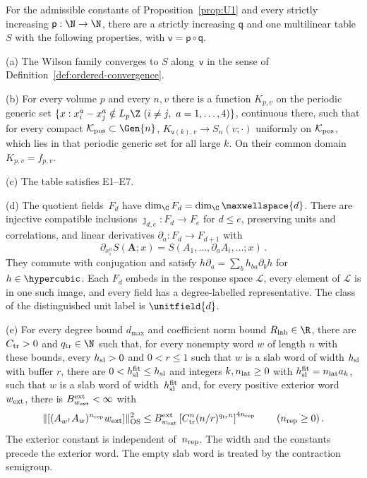 \begin{proposition}\label{prop:P5}
For the admissible constants of Proposition~\ref{prop:U1} and every strictly increasing $\mathsf p:\N\to\N$, there are a strictly increasing $\mathsf q$ and one multilinear table $S$ with the following properties, with $\mathsf v=\mathsf p\circ\mathsf q$.

(a) The Wilson family converges to $S$ along~$\mathsf v$ in the sense of Definition~\ref{def:ordered-convergence}.

(b) For every volume $p$ and every $n,v$ there is a function $K_{p,v}$ on the periodic generic set $\{x:x_i^a-x_j^a\notin L_p\Z\ (i\ne j,\ a=1,\ldots,4)\}$, continuous there, such that for every compact $\mathcal K_{\rm pos}\subset\Gen{n}$, $K_{\mathsf v(k),v}\to S_n(v;\cdot)$ uniformly on $\mathcal K_{\rm pos}$, which lies in that periodic generic set for all large $k$. On their common domain $K_{p,v}=f_{p,v}$.

(c) The table satisfies E1–E7.

(d) The quotient fields~$F_d$ have $\dim_{\C}F_d=\dim_{\C}\maxwellspace{d}$. There are injective compatible inclusions $\jmath_{d,e}:F_d\to F_e$ for $d\le e$, preserving units and correlations, and linear derivatives $\partial_a:F_d\to F_{d+1}$ with
\begin{equation}\label{eq:P5-1}
\partial_{x_i^a}S(\boldsymbol A;x)=S(A_1,\ldots,\partial_aA_i,\ldots;x)\,.
\end{equation}
They commute with conjugation and satisfy $h\partial_a=\sum_bh_{ba}\partial_bh$ for $h\in \hypercubic$. Each $F_d$ embeds in the response space $\mathcal L$, every element of $\mathcal L$ is in one such image, and every field has a degree-labelled representative. The class of the distinguished unit label is $\unitfield{d}$.

(e) For every degree bound $d_{\max}$ and coefficient norm bound $R_{\rm lab}\in\R$, there are $C_{\rm tr}>0$ and $q_{\rm tr}\in\N$ such that, for every nonempty word $w$ of length $n$ with these bounds, every $h_{\rm sl}>0$ and $0<r\le1$ such that $w$ is a slab word of width $h_{\rm sl}$ with buffer $r$, there are $0<h_{\rm sl}^{\rm fit}\le h_{\rm sl}$ and integers $k,n_{\rm lat}\ge0$ with $h_{\rm sl}^{\rm fit}=n_{\rm lat}a_k$, such that $w$ is a slab word of width~$h_{\rm sl}^{\rm fit}$ and, for every positive exterior word~$w_{\rm ext}$, there is $B_{w_{\rm ext}}^{\rm ext}<\infty$ with
\begin{equation}\label{eq:P5-2}
\|[(A_{w^\dagger}A_w)^{n_{\rm rep}}w_{\rm ext}]\|_{\mathrm{OS}}^2\le B_{w_{\rm ext}}^{\rm ext}\left[C_{\rm tr}^n(n/r)^{q_{\rm tr}n}\right]^{4n_{\rm rep}}\qquad(n_{\rm rep}\ge0)\,.
\end{equation}
The exterior constant is independent of~$n_{\rm rep}$. The width and the constants precede the exterior word. The empty slab word is treated by the contraction semigroup.
\end{proposition}

